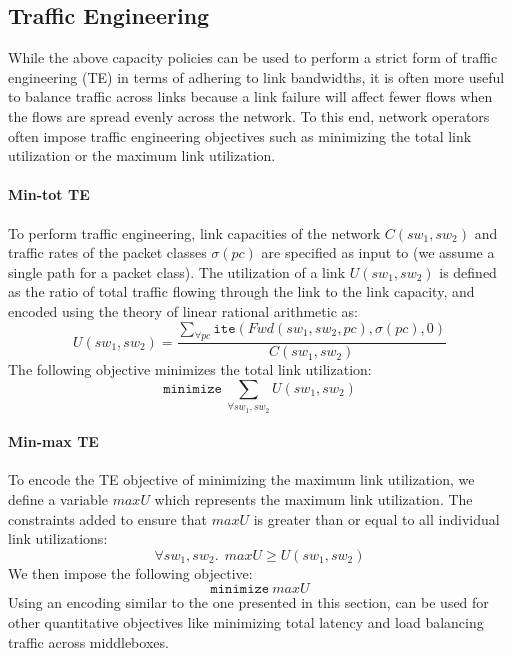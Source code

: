 \subsection{Traffic Engineering}
While the above capacity policies can be used to perform a strict form
of traffic engineering (TE) in terms of adhering to link bandwidths,
it is often more useful to balance traffic across links because a
link failure will affect fewer flows when the flows are spread evenly
across the network.  To this end, network operators often impose
traffic engineering objectives such as minimizing the total link
utilization or the maximum link utilization. 

\paragraph{Min-tot TE}
To perform traffic engineering, link capacities of the network $C(sw_1, sw_2)$ and traffic 
rates of the packet classes $\sigma(pc)$ are specified as input to \name (we assume a single
path for a packet class). The utilization 
of a link $U(sw_1, sw_2)$ is defined as the ratio of total traffic flowing through the link to the 
link capacity, and encoded using the theory of linear rational arithmetic as:
\begin{equation}
U(sw_1, sw_2) = \frac{\sum_{\forall pc} \texttt{ite}(Fwd(sw_1,sw_2, pc), \sigma(pc), 0)} {C(sw_1, sw_2)}
\end{equation}
The following objective minimizes the total link utilization:
\begin{equation}
	\texttt{minimize}\ \sum_{\forall sw_1, sw_2} U(sw_1, sw_2)
\end{equation}
\paragraph{Min-max TE}
To encode the TE objective of minimizing the maximum link utilization, we define
a variable $maxU$ which represents the maximum
link utilization. 
The constraints added to ensure that $maxU$ is greater than or equal to all 
individual link utilizations:
\begin{equation} \label{eq:maxu}
\forall sw_1, sw_2.\ \ maxU \geq U(sw_1, sw_2)
\end{equation} 
We then impose the following objective:
\begin{equation}
		\texttt{minimize}\ maxU
\end{equation}
Using an encoding similar to the one presented in this section, \name can be used for other
quantitative objectives like minimizing total latency and load balancing
traffic across middleboxes.

